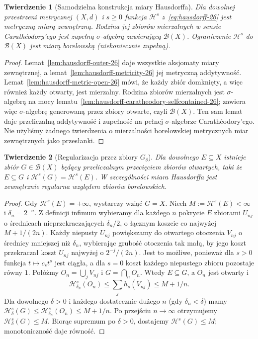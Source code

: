 \documentclass[11pt,a4paper,oneside]{book}
\numberwithin{equation}{chapter}
\theoremstyle{plain}
\newtheorem{twierdzenie}{Twierdzenie}[chapter]
\theoremstyle{definition}
\theoremstyle{remark}
\begin{document}
\begin{twierdzenie}[Samodzielna konstrukcja miary Hausdorffa]
\label{thm:hausdorff-borel-26}
Dla dowolnej przestrzeni metrycznej $(X,d)$ i $s\geq0$
funkcja $\mathcal H^s$ z~\eqref{eq:hausdorff-26}
jest metryczną miarą zewnętrzną. Rodzina jej zbiorów
mierzalnych w sensie Carathéodory'ego jest zupełną
$\sigma$-algebrą zawierającą $\mathcal B(X)$.
Ograniczenie $\mathcal H^s$ do $\mathcal B(X)$ jest
miarą borelowską (niekoniecznie zupełną).
\end{twierdzenie}
\begin{proof}
Lemat~\ref{lem:hausdorff-outer-26} daje
wszystkie aksjomaty miary zewnętrznej,
a lemat~\ref{lem:hausdorff-metricity-26}
jej metryczną addytywność.
Lemat~\ref{lem:hausdorff-metric-open-26} mówi, że
każdy zbiór domknięty, a więc również każdy otwarty,
jest mierzalny. Rodzina zbiorów mierzalnych jest
$\sigma$-algebrą na mocy
lematu~\ref{lem:hausdorff-caratheodory-selfcontained-26};
zawiera więc $\sigma$-algebrę generowaną przez
zbiory otwarte, czyli $\mathcal B(X)$.
Ten sam lemat daje przeliczalną addytywność
i zupełność na pełnej $\sigma$-algebrze
Carathéodory'ego. Nie użyliśmy żadnego twierdzenia
o mierzalności borelowskiej metrycznych miar zewnętrznych
jako przesłanki.
\end{proof}

\begin{twierdzenie}[Regularizacja przez zbiory $G_\delta$]
\label{thm:hausdorff-gdelta-26}
Dla dowolnego $E\subseteq X$ istnieje zbiór
$G\in\mathcal B(X)$ będący przeliczalnym
przecięciem zbiorów otwartych, taki że
$E\subseteq G$ i $\mathcal H^s(G)=\mathcal H^s(E)$.
W szczególności miara Hausdorffa jest zewnętrznie
regularna względem zbiorów borelowskich.
\end{twierdzenie}
\begin{proof}
Gdy $\mathcal H^s(E)=+\infty$, wystarczy wziąć $G=X$.
Niech $M:=\mathcal H^s(E)<\infty$ i $\delta_n=2^{-n}$.
Z definicji infimum wybieramy dla każdego $n$
pokrycie $E$ zbiorami $U_{nj}$ o średnicach
nieprzekraczających $\delta_n/2$, o łącznym
koszcie co najwyżej $M+1/(2n)$.
Każdy niepusty $U_{nj}$ powiększamy do
otwartego otoczenia $V_{nj}$ o średnicy
mniejszej niż $\delta_n$, wybierając grubość
otoczenia tak małą, by jego koszt przekraczał
koszt $U_{nj}$ najwyżej o $2^{-j}/(2n)$.
Jest to możliwe, ponieważ dla $s>0$ funkcja
$t\mapsto c_st^s$ jest ciągła, a dla $s=0$
koszt każdego niepustego zbioru pozostaje równy $1$.
Połóżmy $O_n=\bigcup_jV_{nj}$ i $G=\bigcap_nO_n$.
Wtedy $E\subseteq G$, a $O_n$ jest otwarty i
\[
 \mathcal H^s_{\delta_n}(O_n)
 \leq\sum_jh_s(V_{nj})\leq M+1/n.
\]
Dla dowolnego $\delta>0$ i każdego dostatecznie
dużego $n$ (gdy $\delta_n<\delta$) mamy
$\mathcal H^s_\delta(G)\leq
\mathcal H^s_{\delta_n}(O_n)\leq M+1/n$.
Po przejściu $n\to\infty$ otrzymujemy
$\mathcal H^s_\delta(G)\leq M$.
Biorąc supremum po $\delta>0$,
dostajemy $\mathcal H^s(G)\leq M$;
monotoniczność daje równość.
\end{proof}
\end{document}
